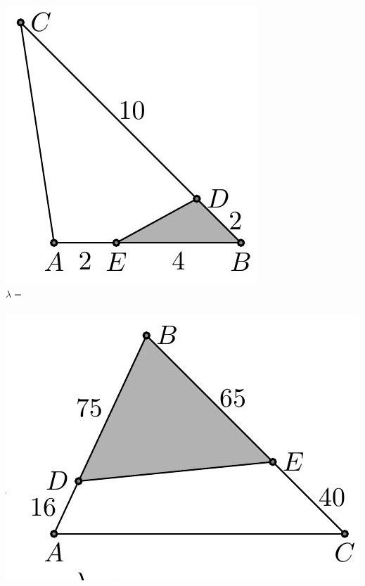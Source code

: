 \documentclass[10pt]{article}
\begin{document}
\includegraphics[max width=\textwidth, center]{2024_11_21_e9b4faa005d5be2cc318g-024(1)}\\
\(\lambda=\) \(\qquad\)\\
\(\qquad\)\\
\includegraphics[max width=\textwidth, center]{2024_11_21_e9b4faa005d5be2cc318g-024}\\
\end{document}
